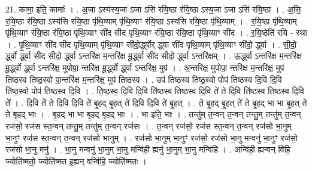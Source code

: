 \documentclass[17pt]{extarticle}
\begin{document}
21. कामा॒ इति॒ कामाः᳚ । . अ॒जा ऽस्य॑स्य॒जा ऽजा ऽसि॑ रयि॒ष्ठा र॑यि॒ष्ठा ऽस्य॒जा ऽजा ऽसि॑ रयि॒ष्ठा । . अ॒सि॒ र॒यि॒ष्ठा र॑यि॒ष्ठा ऽस्य॑सि रयि॒ष्ठा पृ॑थि॒व्याम् पृ॑थि॒व्याꣳ र॑यि॒ष्ठा ऽस्य॑सि रयि॒ष्ठा पृ॑थि॒व्याम् । . र॒यि॒ष्ठा पृ॑थि॒व्याम् पृ॑थि॒व्याꣳ र॑यि॒ष्ठा र॑यि॒ष्ठा पृ॑थि॒व्याꣳ सी॑द सीद पृथि॒व्याꣳ र॑यि॒ष्ठा र॑यि॒ष्ठा पृ॑थि॒व्याꣳ सी॑द । . र॒यि॒ष्ठेति॑ रयि - स्था । . पृ॒थि॒व्याꣳ सी॑द सीद पृथि॒व्याम् पृ॑थि॒व्याꣳ सी॑दो॒र्द्ध्वोर् द्ध्वा सी॑द पृथि॒व्याम् पृ॑थि॒व्याꣳ सी॑दो॒ र्द्ध्वा । . सी॒दो॒ र्द्ध्वो र्द्ध्वा सी॑द सीदो॒ र्द्ध्वा ऽन्तरि॑क्ष म॒न्तरि॑क्ष मू॒र्द्ध्वा सी॑द सीदो॒ र्द्ध्वा ऽन्तरि॑क्षम् । . ऊ॒र्द्ध्वा ऽन्तरि॑क्ष म॒न्तरि॑क्ष मू॒र्द्ध्वो र्द्ध्वा ऽन्तरि॑क्ष॒ मुपोपा॒ न्तरि॑क्ष मू॒र्द्ध्वो र्द्ध्वा ऽन्तरि॑क्ष॒ मुप॑ । . अ॒न्तरि॑क्ष॒ मुपोपा॒ न्तरि॑क्ष म॒न्तरि॑क्ष॒ मुप॑ तिष्ठस्व तिष्ठ॒स्वो पा॒न्तरि॑क्ष म॒न्तरि॑क्ष॒ मुप॑ तिष्ठस्व । . उप॑ तिष्ठस्व तिष्ठ॒स्वो पोप॑ तिष्ठस्व दि॒वि दि॒वि ति॑ष्ठ॒स्वो पोप॑ तिष्ठस्व दि॒वि । . ति॒ष्ठ॒स्व॒ दि॒वि दि॒वि ति॑ष्ठस्व तिष्ठस्व दि॒वि ते॑ ते दि॒वि ति॑ष्ठस्व तिष्ठस्व दि॒वि ते᳚ । . दि॒वि ते॑ ते दि॒वि दि॒वि ते॑ बृ॒हद् बृ॒हत् ते॑ दि॒वि दि॒वि ते॑ बृ॒हत् । . ते॒ बृ॒हद् बृ॒हत् ते॑ ते बृ॒हद् भा भा बृ॒हत् ते॑ ते बृ॒हद् भाः । . बृ॒हद् भा भा बृ॒हद् बृ॒हद् भाः । . भा इति॒ भाः । . तन्तु॑म् त॒न्वन् त॒न्वन् तन्तु॒म् तन्तु॑म् त॒न्वन् रज॑सो॒ रज॑स स्त॒न्वन् तन्तु॒म् तन्तु॑म् त॒न्वन् रज॑सः । . त॒न्वन् रज॑सो॒ रज॑स स्त॒न्वन् त॒न्वन् रज॑सो भा॒नुम् भा॒नुꣳ रज॑स स्त॒न्वन् त॒न्वन् रज॑सो भा॒नुम् । . रज॑सो भा॒नुम् भा॒नुꣳ रज॑सो॒ रज॑सो भा॒नु मन्वनु॑ भा॒नुꣳ रज॑सो॒ रज॑सो भा॒नु मनु॑ । . भा॒नु मन्वनु॑ भा॒नुम् भा॒नु मन्वि॑ही॒ ह्यनु॑ भा॒नुम् भा॒नु मन्वि॑हि । . अन्वि॑ही॒ ह्यन्वन् वि॑हि॒ ज्योति॑ष्मतो॒ ज्योति॑ष्मत इ॒ह्यन् वन्वि॑हि॒ ज्योति॑ष्मतः । \newline
\end{document}
